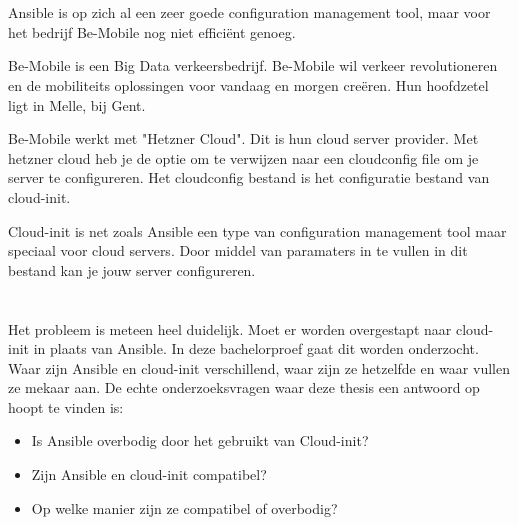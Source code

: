 \section{}
\label{sec:context}

Ansible is op zich al een zeer goede configuration management tool, maar voor het bedrijf Be-Mobile nog niet efficiënt genoeg. 

Be-Mobile is een Big Data verkeersbedrijf. Be-Mobile wil verkeer revolutioneren en de mobiliteits oplossingen voor vandaag en morgen creëren. Hun hoofdzetel ligt in Melle, bij Gent. 

Be-Mobile werkt met "Hetzner Cloud". Dit is hun cloud server provider. Met hetzner cloud heb je de optie om te verwijzen naar een cloudconfig file om je server te configureren. Het cloudconfig bestand is het configuratie  bestand van cloud-init. 

Cloud-init is net zoals Ansible een type van configuration management tool maar speciaal voor cloud servers. Door middel van paramaters in te vullen in dit bestand kan je jouw server configureren.
 


\section{}
\label{sec:probleemstellingonderzoeksvraag}

Het probleem is meteen heel duidelijk. Moet er worden overgestapt naar cloud-init in plaats van Ansible. In deze bachelorproef gaat dit worden onderzocht. Waar zijn Ansible en cloud-init verschillend, waar zijn ze hetzelfde en waar vullen ze mekaar aan. De echte onderzoeksvragen waar deze thesis een antwoord op hoopt te vinden is:

\begin{itemize}
    \item Is Ansible overbodig door het gebruikt van Cloud-init?
    \item Zijn Ansible en cloud-init compatibel?
    \item Op welke manier zijn ze compatibel of overbodig?
\end{itemize}



